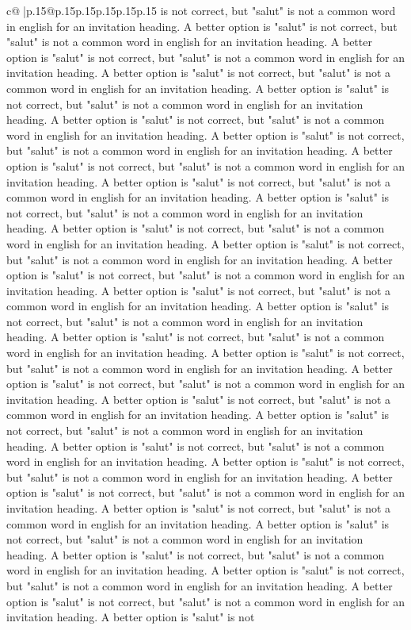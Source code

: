 \documentclass{article}
\begin{document}
{\begin{supertabular}{c@{$\;$}|p{.15\linewidth}@{}p{.15\linewidth}p{.15\linewidth}p{.15\linewidth}p{.15\linewidth}p{.15\linewidth}}
{{{is not correct, but "salut" is not a common word in english for an invitation heading. A better option is "salut" is not correct, but "salut" is not a common word in english for an invitation heading. A better option is "salut" is not correct, but "salut" is not a common word in english for an invitation heading. A better option is "salut" is not correct, but "salut" is not a common word in english for an invitation heading. A better option is "salut" is not correct, but "salut" is not a common word in english for an invitation heading. A better option is "salut" is not correct, but "salut" is not a common word in english for an invitation heading. A better option is "salut" is not correct, but "salut" is not a common word in english for an invitation heading. A better option is "salut" is not correct, but "salut" is not a common word in english for an invitation heading. A better option is "salut" is not correct, but "salut" is not a common word in english for an invitation heading. A better option is "salut" is not correct, but "salut" is not a common word in english for an invitation heading. A better option is "salut" is not correct, but "salut" is not a common word in english for an invitation heading. A better option is "salut" is not correct, but "salut" is not a common word in english for an invitation heading. A better option is "salut" is not correct, but "salut" is not a common word in english for an invitation heading. A better option is "salut" is not correct, but "salut" is not a common word in english for an invitation heading. A better option is "salut" is not correct, but "salut" is not a common word in english for an invitation heading. A better option is "salut" is not correct, but "salut" is not a common word in english for an invitation heading. A better option is "salut" is not correct, but "salut" is not a common word in english for an invitation heading. A better option is "salut" is not correct, but "salut" is not a common word in english for an invitation heading. A better option is "salut" is not correct, but "salut" is not a common word in english for an invitation heading. A better option is "salut" is not correct, but "salut" is not a common word in english for an invitation heading. A better option is "salut" is not correct, but "salut" is not a common word in english for an invitation heading. A better option is "salut" is not correct, but "salut" is not a common word in english for an invitation heading. A better option is "salut" is not correct, but "salut" is not a common word in english for an invitation heading. A better option is "salut" is not correct, but "salut" is not a common word in english for an invitation heading. A better option is "salut" is not correct, but "salut" is not a common word in english for an invitation heading. A better option is "salut" is not correct, but "salut" is not a common word in english for an invitation heading. A better option is "salut" is not correct, but "salut" is not a common word in english for an invitation heading. A better option is "salut" is not correct, but "salut" is not a common word in english for an invitation heading. A better option is "salut" is not }}}
\end{supertabular}}
\end{document}
